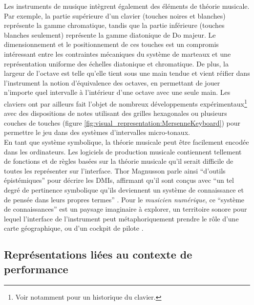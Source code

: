 \noindent Les instruments de musique intègrent également des éléments de théorie musicale. Par exemple, la partie supérieure d'un clavier (touches noires et blanches) représente la gamme chromatique, tandis que la partie inférieure (touches blanches seulement) représente la gamme diatonique de Do majeur. Le dimensionnement et le positionnement de ces touches est un compromis intéressant entre les contraintes mécaniques du système de marteaux et une représentation uniforme des échelles diatonique et chromatique. De plus, la largeur de l'octave est telle qu'elle tient sous une main tendue et vient réifier dans l'instrument la notion d'équivalence des octaves, en permettant de jouer n'importe quel intervalle à l'intérieur d'une octave avec une seule main. Les claviers ont par ailleurs fait l'objet de nombreux développements expérimentaux\footnote{Voir notamment \cite{haury_petite_1999} pour un historique du clavier.} avec des dispositions de notes utilisant des grilles hexagonales ou plusieurs couches de touches (figure \ref{fig:visual_representation:MersenneKeyboard}) pour permettre le jeu dans des systèmes d'intervalles micro-tonaux.\\
\indent En tant que système symbolique, la théorie musicale peut être facilement encodée dans les ordinateurs. Les logiciels de production musicale contiennent tellement de fonctions et de règles basées sur la théorie musicale qu'il serait difficile de toutes les représenter sur l'interface. Thor Magnusson parle ainsi ``d'outils épistémiques'' pour décrire les \glspl{DMI}, affirmant qu'il sont conçus avec ``un tel degré de pertinence symbolique qu'ils deviennent un système de connaissance et de pensée dans leurs propres termes'' \cite{magnusson_epistemic_2009}. Pour le \textit{musicien numérique}, ce ``système de connaissances'' est un paysage imaginaire à explorer, un territoire sonore pour lequel l'interface de l'instrument peut métaphoriquement prendre le rôle d'une carte géographique, ou d'un cockpit de pilote \cite{vertegaal_towards_1996}.

\subsection{Représentations liées au contexte de performance}

